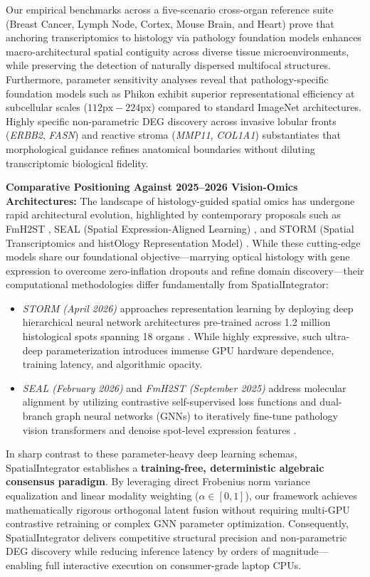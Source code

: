 \documentclass[11pt, a4paper]{article}
\begin{document}
Our empirical benchmarks across a five-scenario cross-organ reference suite (Breast Cancer, Lymph Node, Cortex, Mouse Brain, and Heart) prove that anchoring transcriptomics to histology via pathology foundation models enhances macro-architectural spatial contiguity across diverse tissue microenvironments, while preserving the detection of naturally dispersed multifocal structures. Furthermore, parameter sensitivity analyses reveal that pathology-specific foundation models such as Phikon exhibit superior representational efficiency at subcellular scales ($112\text{px}-224\text{px}$) compared to standard ImageNet architectures. Highly specific non-parametric DEG discovery across invasive lobular fronts (\textit{ERBB2}, \textit{FASN}) and reactive stroma (\textit{MMP11}, \textit{COL1A1}) substantiates that morphological guidance refines anatomical boundaries without diluting transcriptomic biological fidelity.

\textbf{Comparative Positioning Against 2025--2026 Vision-Omics Architectures:} The landscape of histology-guided spatial omics has undergone rapid architectural evolution, highlighted by contemporary proposals such as FmH2ST \cite{fmh2st2025}, SEAL (Spatial Expression-Aligned Learning) \cite{seal2026}, and STORM (Spatial Transcriptomics and histOlogy Representation Model) \cite{storm2026}. While these cutting-edge models share our foundational objective—marrying optical histology with gene expression to overcome zero-inflation dropouts and refine domain discovery—their computational methodologies differ fundamentally from SpatialIntegrator:
\begin{itemize}
    \item \textit{STORM (April 2026)} approaches representation learning by deploying deep hierarchical neural network architectures pre-trained across 1.2 million histological spots spanning 18 organs \cite{storm2026}. While highly expressive, such ultra-deep parameterization introduces immense GPU hardware dependence, training latency, and algorithmic opacity.
    \item \textit{SEAL (February 2026)} and \textit{FmH2ST (September 2025)} address molecular alignment by utilizing contrastive self-supervised loss functions and dual-branch graph neural networks (GNNs) to iteratively fine-tune pathology vision transformers and denoise spot-level expression features \cite{seal2026, fmh2st2025}.
\end{itemize}
In sharp contrast to these parameter-heavy deep learning schemas, SpatialIntegrator establishes a \textbf{training-free, deterministic algebraic consensus paradigm}. By leveraging direct Frobenius norm variance equalization and linear modality weighting ($\alpha \in [0,1]$), our framework achieves mathematically rigorous orthogonal latent fusion without requiring multi-GPU contrastive retraining or complex GNN parameter optimization. Consequently, SpatialIntegrator delivers competitive structural precision and non-parametric DEG discovery while reducing inference latency by orders of magnitude—enabling full interactive execution on consumer-grade laptop CPUs.
\end{document}

